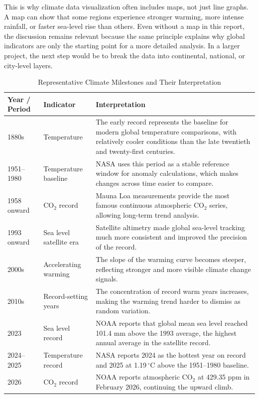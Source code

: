 \documentclass[conference]{IEEEtran}
\begin{document}
This is why climate data visualization often includes maps, not just line graphs. A map can show that some regions experience stronger warming, more intense rainfall, or faster sea-level rise than others. Even without a map in this report, the discussion remains relevant because the same principle explains why global indicators are only the starting point for a more detailed analysis. In a larger project, the next step would be to break the data into continental, national, or city-level layers.

\begin{table}[t]
\caption{Representative Climate Milestones and Their Interpretation}
\centering
\begin{tabular}{p{} p{} p{}}
\toprule
Year / Period & Indicator & Interpretation \\
\midrule
1880s & Temperature & The early record represents the baseline for modern global temperature comparisons, with relatively cooler conditions than the late twentieth and twenty-first centuries. \\
1951--1980 & Temperature baseline & NASA uses this period as a stable reference window for anomaly calculations, which makes changes across time easier to compare. \\
1958 onward & CO$_2$ record & Mauna Loa measurements provide the most famous continuous atmospheric CO$_2$ series, allowing long-term trend analysis. \\
1993 onward & Sea level satellite era & Satellite altimetry made global sea-level tracking much more consistent and improved the precision of the record. \\
2000s & Accelerating warming & The slope of the warming curve becomes steeper, reflecting stronger and more visible climate change signals. \\
2010s & Record-setting years & The concentration of record warm years increases, making the warming trend harder to dismiss as random variation. \\
2023 & Sea level record & NOAA reports that global mean sea level reached 101.4 mm above the 1993 average, the highest annual average in the satellite record. \\
2024--2025 & Temperature record & NASA reports 2024 as the hottest year on record and 2025 at 1.19\,$^\circ$C above the 1951--1980 baseline. \\
2026 & CO$_2$ record & NOAA reports atmospheric CO$_2$ at 429.35 ppm in February 2026, continuing the upward climb. \\
\bottomrule
\end{tabular}
\end{table}
\end{document}
